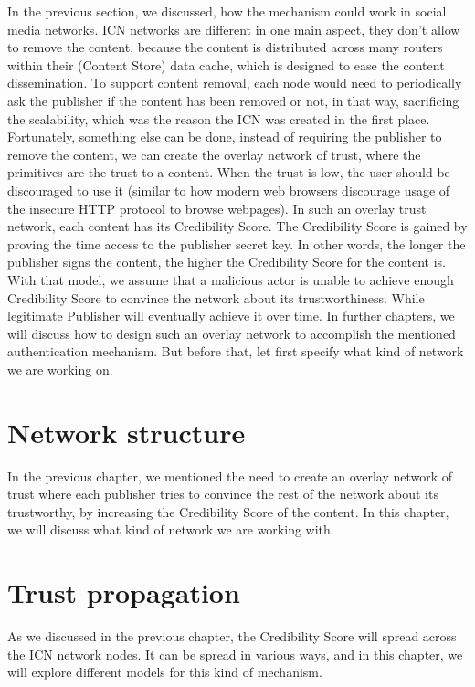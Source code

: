 \documentclass[nostrict]{szablonPG}
\begin{document}
In the previous section, we discussed, how the mechanism could work in social media networks. ICN networks are different in one main aspect, they don't allow to remove the content, because the content is distributed across many routers within their (Content Store) data cache, which is designed to ease the content dissemination. To support content removal, each node would need to periodically ask the publisher if the content has been removed or not, in that way, sacrificing the scalability, which was the reason the ICN was created in the first place. 
Fortunately, something else can be done, instead of requiring the publisher to remove the content, we can create the overlay network of trust, where the primitives are the trust to a content. When the trust is low, the user should be discouraged to use it (similar to how modern web browsers discourage usage of the insecure HTTP protocol to browse webpages). In such an overlay trust network, each content has its Credibility Score. The Credibility Score is gained by proving the time access to the publisher secret key. In other words, the longer the publisher signs the content, the higher the Credibility Score for the content is. With that model, we assume that a malicious actor is unable to achieve enough Credibility Score to convince the network about its trustworthiness. While legitimate Publisher will eventually achieve it over time. In further chapters, we will discuss how to design such an overlay network to accomplish the mentioned authentication mechanism. But before that, let first specify what kind of network we are working on.

\section{Network structure}
In the previous chapter, we mentioned the need to create an overlay network of trust where each publisher tries to convince the rest of the network about its trustworthy, by increasing the Credibility Score of the content. In this chapter, we will discuss what kind of network we are working with. 

\section{Trust propagation}

As we discussed in the previous chapter, the Credibility Score will spread across the ICN network nodes. It can be spread in various ways, and in this chapter, we will explore different models for this kind of mechanism. 
\end{document}
